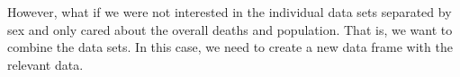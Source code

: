 \documentclass[
]{book}
\newenvironment{Shaded}{\begin{snugshade}}{\end{snugshade}}
\newcommand{\DecValTok}[1]{\textcolor[rgb]{0.00,0.00,0.81}{#1}}
\newcommand{\FunctionTok}[1]{\textcolor[rgb]{0.00,0.00,0.00}{#1}}
\newcommand{\NormalTok}[1]{#1}
\newcommand{\OtherTok}[1]{\textcolor[rgb]{0.56,0.35,0.01}{#1}}
\newcommand{\SpecialCharTok}[1]{\textcolor[rgb]{0.00,0.00,0.00}{#1}}
\theoremstyle{definition}
\theoremstyle{definition}
\theoremstyle{definition}
\theoremstyle{definition}
\theoremstyle{remark}
\begin{document}
However, what if we were not interested in the individual data sets separated by sex and only cared about the overall deaths and population. That is, we want to combine the data sets. In this case, we need to create a new data frame with the relevant data.

\begin{Shaded}
\end{Shaded}
\end{document}
